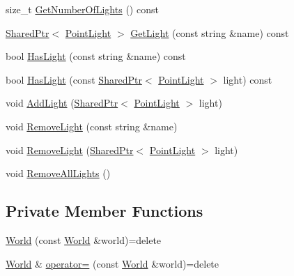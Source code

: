 \begin{DoxyCompactItemize}
\item 
size\+\_\+t \hyperlink{classmage_1_1_world_a786420d8d8b97065ee591753b7f1541b}{Get\+Number\+Of\+Lights} () const
\item 
\hyperlink{namespacemage_a1e01ae66713838a7a67d30e44c67703e}{Shared\+Ptr}$<$ \hyperlink{structmage_1_1_point_light}{Point\+Light} $>$ \hyperlink{classmage_1_1_world_ac7c1a382b10e67bd42493af3966c9212}{Get\+Light} (const string \&name) const
\item 
bool \hyperlink{classmage_1_1_world_af83318e3810a5658aa37285df708aa81}{Has\+Light} (const string \&name) const
\item 
bool \hyperlink{classmage_1_1_world_ac76eb3df75c68ec28b7a9db9b0576171}{Has\+Light} (const \hyperlink{namespacemage_a1e01ae66713838a7a67d30e44c67703e}{Shared\+Ptr}$<$ \hyperlink{structmage_1_1_point_light}{Point\+Light} $>$ light) const
\item 
void \hyperlink{classmage_1_1_world_ab0c31d3113ea264fed8b8ef034047c91}{Add\+Light} (\hyperlink{namespacemage_a1e01ae66713838a7a67d30e44c67703e}{Shared\+Ptr}$<$ \hyperlink{structmage_1_1_point_light}{Point\+Light} $>$ light)
\item 
void \hyperlink{classmage_1_1_world_a06f60650aa7992f44167043d1aa2e576}{Remove\+Light} (const string \&name)
\item 
void \hyperlink{classmage_1_1_world_ab2bca0a737500b2d78b39e6cbafd61d0}{Remove\+Light} (\hyperlink{namespacemage_a1e01ae66713838a7a67d30e44c67703e}{Shared\+Ptr}$<$ \hyperlink{structmage_1_1_point_light}{Point\+Light} $>$ light)
\item 
void \hyperlink{classmage_1_1_world_a5fafe529414d511e88b98ccd8e2f951f}{Remove\+All\+Lights} ()
\end{DoxyCompactItemize}
\subsection*{Private Member Functions}
\begin{DoxyCompactItemize}
\item 
\hyperlink{classmage_1_1_world_a28e20e33499cd57282cefa5ab0fda041}{World} (const \hyperlink{classmage_1_1_world}{World} \&world)=delete
\item 
\hyperlink{classmage_1_1_world}{World} \& \hyperlink{classmage_1_1_world_aa7074e3847c9fbe1466aa833f194eed0}{operator=} (const \hyperlink{classmage_1_1_world}{World} \&world)=delete
\end{DoxyCompactItemize}
